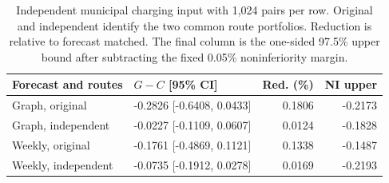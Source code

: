 \begin{table}[t]
\centering
\caption{Independent municipal charging input with 1,024 pairs per row. Original and independent identify the two common route portfolios. Reduction is relative to forecast matched. The final column is the one-sided 97.5\% upper bound after subtracting the fixed 0.05\% noninferiority margin.}
\label{tab:guarded-transfer}
\footnotesize\setlength{\tabcolsep}{3pt}\renewcommand{\arraystretch}{1.12}
\begin{tabular}{@{}p{}p{}rr@{}}
\toprule
Forecast and routes & $G-C$ [95\% CI] & Red. (\%) & NI upper \\
\midrule
Graph, original & -0.2826 [-0.6408, 0.0433] & 0.1806 & -0.2173 \\
Graph, independent & -0.0227 [-0.1109, 0.0607] & 0.0124 & -0.1828 \\
Weekly, original & -0.1761 [-0.4869, 0.1121] & 0.1338 & -0.1487 \\
Weekly, independent & -0.0735 [-0.1912, 0.0278] & 0.0169 & -0.2193 \\
\bottomrule
\end{tabular}
\end{table}
